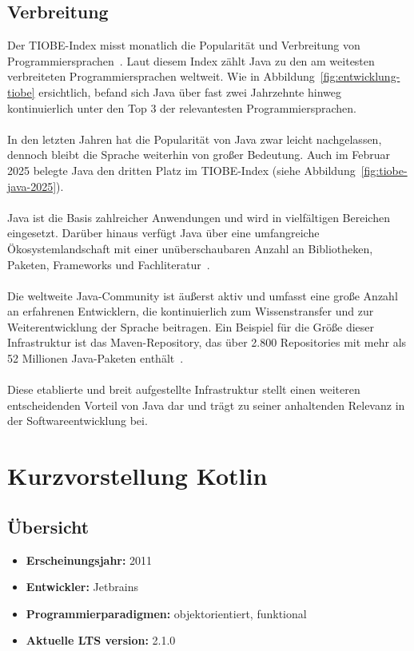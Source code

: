 \documentclass[11pt]{article}
\begin{document}
    \subsection{Verbreitung}
    Der TIOBE-Index misst monatlich die Popularität und Verbreitung von Programmiersprachen~\cite{tiobe}.
    Laut diesem Index zählt Java zu den am weitesten verbreiteten Programmiersprachen weltweit.
    Wie in Abbildung~\ref{fig:entwicklung-tiobe} ersichtlich, befand sich Java über fast zwei Jahrzehnte hinweg
    kontinuierlich unter den Top 3 der relevantesten Programmiersprachen.\\
    \\
    In den letzten Jahren hat die Popularität von Java zwar leicht nachgelassen, dennoch bleibt die Sprache weiterhin
    von großer Bedeutung.
    Auch im Februar 2025 belegte Java den dritten Platz im TIOBE-Index (siehe Abbildung~\ref{fig:tiobe-java-2025}).\\
    \\
    Java ist die Basis zahlreicher Anwendungen und wird in vielfältigen Bereichen eingesetzt.
    Darüber hinaus verfügt Java über eine umfangreiche Ökosystemlandschaft mit einer unüberschaubaren Anzahl an Bibliotheken, Paketen, Frameworks und Fachliteratur~\cite[55]{insel}.\\
    \\
    Die weltweite Java-Community ist äußerst aktiv und umfasst eine große Anzahl an erfahrenen Entwicklern, die kontinuierlich zum Wissenstransfer und zur Weiterentwicklung der Sprache beitragen.
    Ein Beispiel für die Größe dieser Infrastruktur ist das Maven-Repository, das über 2.800 Repositories mit mehr als 52 Millionen Java-Paketen enthält~\cite{maven}.\\
    \\
    Diese etablierte und breit aufgestellte Infrastruktur stellt einen weiteren entscheidenden Vorteil von Java dar und
    trägt zu seiner anhaltenden Relevanz in der Softwareentwicklung bei.\\

    \section{Kurzvorstellung Kotlin}

    \subsection{Übersicht}
    \begin{itemize}
        \item \textbf{Erscheinungsjahr:} 2011
        \item \textbf{Entwickler:} Jetbrains
        \item \textbf{Programmierparadigmen:} objektorientiert, funktional
        \item \textbf{Aktuelle LTS version:} 2.1.0
    \end{itemize}
\end{document}

